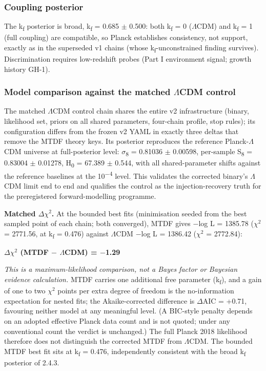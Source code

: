 \documentclass[11pt,a4paper]{article}
\begin{document}
\subsubsection{Coupling posterior}
The k\textsubscript{f} posterior is broad, k\textsubscript{f} = 0.685 $\pm$ 0.500: both k\textsubscript{f} = 0 ($\Lambda$CDM) and k\textsubscript{f} = 1 (full coupling) are compatible, so Planck establishes consistency, not support, exactly as in the superseded v1 chains (whose k\textsubscript{f}-unconstrained finding survives). Discrimination requires low-redshift probes (Part I environment signal; growth history GH-1).

\subsubsection{Model comparison against the matched $\Lambda$CDM control}
The matched $\Lambda$CDM control chain shares the entire v2 infrastructure (binary, likelihood set, priors on all shared parameters, four-chain profile, stop rules); its configuration differs from the frozen v2 YAML in exactly three deltas that remove the MTDF theory keys. Its posterior reproduces the reference Planck-$\Lambda$CDM universe at full-posterior level: $\sigma$\textsubscript{8} = 0.81036 $\pm$ 0.00598, per-sample S\textsubscript{8} = 0.83004 $\pm$ 0.01278, H\textsubscript{0} = 67.389 $\pm$ 0.544, with all shared-parameter shifts against the reference baselines at the 10\textsuperscript{$-$4} level. This validates the corrected binary's $\Lambda$CDM limit end to end and qualifies the control as the injection-recovery truth for the preregistered forward-modelling programme.

\textbf{Matched $\Delta$$\chi$$^{2}$.} At the bounded best fits (minimisation seeded from the best sampled point of each chain; both converged), MTDF gives $-$log L = 1385.78 ($\chi$$^{2}$ = 2771.56, at k\textsubscript{f} = 0.476) against $\Lambda$CDM $-$log L = 1386.42 ($\chi$$^{2}$ = 2772.84):

\begin{center}
\textbf{$\Delta$$\chi$$^{2}$ (MTDF $-$ $\Lambda$CDM) = $-$1.29}
\end{center}

\emph{This is a maximum-likelihood comparison, not a Bayes factor or Bayesian evidence calculation.} MTDF carries one additional free parameter (k\textsubscript{f}), and a gain of one to two $\chi$$^{2}$ points per extra degree of freedom is the no-information expectation for nested fits; the Akaike-corrected difference is $\Delta$AIC = +0.71, favouring neither model at any meaningful level. (A BIC-style penalty depends on an adopted effective Planck data count and is not quoted; under any conventional count the verdict is unchanged.) The full Planck 2018 likelihood therefore does not distinguish the corrected MTDF from $\Lambda$CDM. The bounded MTDF best fit sits at k\textsubscript{f} = 0.476, independently consistent with the broad k\textsubscript{f} posterior of 2.4.3.
\end{document}

